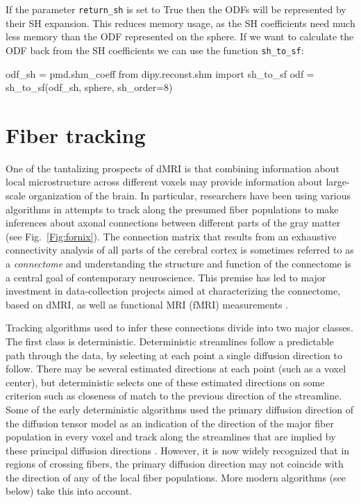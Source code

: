 \documentclass{bioinfo}
\begin{document}
If the parameter \texttt{return\_sh} is set to True then the ODFs will be
represented by their SH expansion. This reduces memory usage, as the SH coefficients need much less memory than the ODF represented
on the sphere. If we want to calculate the ODF back from the SH coefficients we
can use the function \texttt{sh\_to\_sf}:
\begin{python}
odf_sh = pmd.shm_coeff
from dipy.reconst.shm import sh_to_sf
odf = sh_to_sf(odf_sh, sphere, sh_order=8)
\end{python}

\section{Fiber tracking}\label{fiber_tracking}
One of the tantalizing prospects of dMRI is that combining
information about local microstructure across different voxels may provide
information about large-scale organization of the brain. In particular,
researchers have been using various algorithms in attempts to track along the
presumed fiber populations to make inferences about axonal connections between
different parts of the gray matter (see Fig.~\ref{Fig:fornix}). The connection matrix that results from an
exhaustive connectivity analysis of all parts of the cerebral cortex is
sometimes referred to as a \emph{connectome} \citep{sporns2005} and understanding
the structure and function of the connectome is a central goal of contemporary
neuroscience. This premise has led to major investment in data-collection
projects aimed at characterizing the connectome, based on dMRI, as well as
functional MRI (fMRI) measurements \citep{VanEssen2013}.

Tracking algorithms used to infer these connections divide into two major
classes. The first class is deterministic. Deterministic streamlines follow a
predictable path through the data, by selecting at each point a single diffusion
direction to follow.  There may be several estimated directions at each
point (such as a voxel center), but deterministic selects one of these estimated
directions on some criterion such as closeness of match to the previous
direction of the streamline.
Some of the early deterministic algorithms used the
primary diffusion direction of the diffusion tensor model as an indication of the direction
of the major fiber population in every voxel and track along the streamlines
that are implied by these principal diffusion directions \citep{Mori1999,
  conturo-lori-etal:99, basser-pajevic-etal:00} . However, it is
now widely recognized that in regions of crossing fibers, the primary diffusion
direction may not coincide with the direction of any of the local fiber
populations. More modern algorithms (see below) take this into account.
\end{document}
